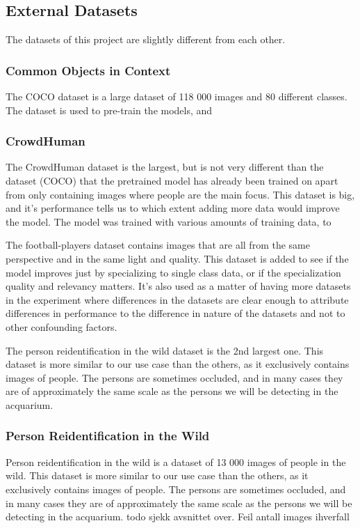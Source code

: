 \subsection{External Datasets}
The datasets of this project are slightly different from each other.

\subsubsection{Common Objects in Context}
The COCO dataset is a large dataset of 118 000 images and 80 different classes. The dataset is used to pre-train the models, and 

\subsubsection{CrowdHuman}
The CrowdHuman dataset is the largest, but is not very different than the dataset (COCO) that the pretrained model has already been trained on apart from only containing images where people are the main focus. This dataset is big, and it's performance tells us to which extent adding more data would improve the model. The model was trained with various amounts of training data, to

The football-players dataset contains images that are all from the same perspective and in the same light and quality. This dataset is added to see if the model improves just by specializing to single class data, or if the specialization quality and relevancy matters. It's also used as a matter of having more datasets in the experiment where differences in the datasets are clear enough to attribute differences in performance to the difference in nature of the datasets and not to other confounding factors.

The person reidentification in the wild dataset is the 2nd largest one. This dataset is more similar to our use case than the others, as it exclusively contains images of people. The persons are sometimes occluded, and in many cases they are of approximately the same scale as the persons we will be detecting in the acquarium.

\subsubsection{Person Reidentification in the Wild}
Person reidentification in the wild is a dataset of 13 000 images of people in the wild. This dataset is more similar to our use case than the others, as it exclusively contains images of people. The persons are sometimes occluded, and in many cases they are of approximately the same scale as the persons we will be detecting in the acquarium.
todo sjekk avsnittet over. Feil antall images ihverfall

